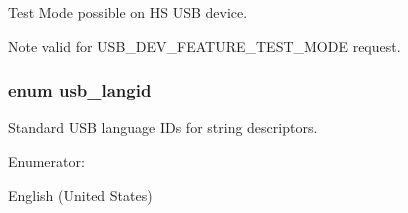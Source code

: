 Test Mode possible on H\-S U\-S\-B device. 

\begin{DoxyNote}{Note}
valid for U\-S\-B\-\_\-\-D\-E\-V\-\_\-\-F\-E\-A\-T\-U\-R\-E\-\_\-\-T\-E\-S\-T\-\_\-\-M\-O\-D\-E request. 
\end{DoxyNote}
\hypertarget{group__usb__protocol__group_ga1f92deaf695c06566999f0c5343978c1}{
\subsubsection[{usb\-\_\-langid}]{\setlength{\rightskip}{0pt plus 5cm}enum {\bf usb\-\_\-langid}}}\label{group__usb__protocol__group_ga1f92deaf695c06566999f0c5343978c1}


Standard U\-S\-B language I\-Ds for string descriptors. 

\begin{Desc}
\item[Enumerator\-: ]\par
\begin{description}
\item[{\em 
\hypertarget{group__usb__protocol__group_gga1f92deaf695c06566999f0c5343978c1a8acad914e2d28c9bb1d2d3cc74c5b39e}{U\-S\-B\-\_\-\-L\-A\-N\-G\-I\-D\-\_\-\-E\-N\-\_\-\-U\-S}\label{group__usb__protocol__group_gga1f92deaf695c06566999f0c5343978c1a8acad914e2d28c9bb1d2d3cc74c5b39e}
}]English (United States) \end{description}
\end{Desc}

